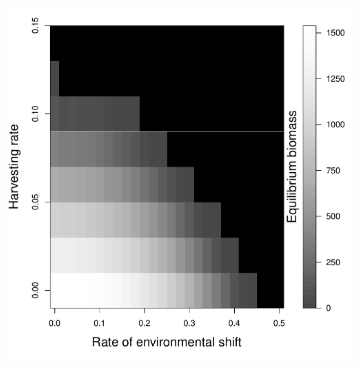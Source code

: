 \documentclass[12pt,english]{article}
\begin{document}
\begin{spacing}{1.9}
\begin{figure}[htbp]
\begin{subfigure}{.33\textwidth}
\end{subfigure}
\begin{subfigure}{.33\textwidth}
\subcaption{}
\includegraphics[width=\textwidth]{plots/eqbiomass_mpa.pdf}
\end{subfigure}
\caption{
}
\label{management}
\end{figure}


\pagebreak


\end{spacing}
\end{document}
